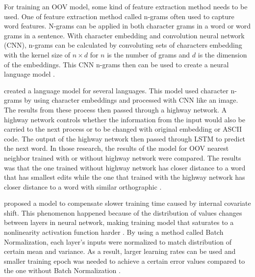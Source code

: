 For training an OOV model, some kind of feature extraction method
needs to be used. One of feature extraction method called n-grams
often used to capture word features. N-grams can be applied in both
character grams in a word or word grams in a sentence. With character
embedding and convolution neural network (CNN), n-grams can be
calculated by convoluting sets of characters embedding with the kernel
size of $n \times d$ for $n$ is the number of grams and $d$ is the
dimension of the embeddings. This CNN n-grams then can be used to
create a neural language model \citep{character2015kim}.

\cite{character2015kim} created a language model for several
languages. This model used character n-grams by using character
embeddings and processed with CNN like an image. The results from
these process then passed through a highway network. A highway network
controls whether the information from the input would also be carried
to the next process or to be changed with original embedding or ASCII
code. The output of the highway network then passed through LSTM to
predict the next word. In those research, the results of the model for
OOV nearest neighbor trained with or without highway network were
compared. The results was that the one trained without highway network
has closer distance to a word that has smallest edits while the one
that trained with the highway network has closer distance to a word
with similar orthographic \citep{character2015kim}.

\cite{batchnorm:DBLP:journals/corr/IoffeS15} proposed a model to
compensate slower training time caused by internal covariate shift.
This phenomenon happened because of the distribution of values changes
between layers in neural network, making training model that saturates
to a nonlinearity activation function harder
\citep{batchnorm:DBLP:journals/corr/IoffeS15}. By using a method
called Batch Normalization, each layer's inputs were normalized to
match distribution of certain mean and variance. As a result, larger
learning rates can be used and smaller training epoch was needed to
achieve a certain error values compared to the one without Batch
Normalization \citep{batchnorm:DBLP:journals/corr/IoffeS15}.